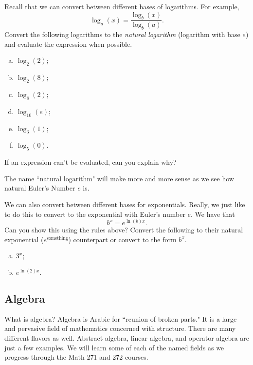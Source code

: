     \begin{problem*}
    Recall that we can convert between different bases of logarithms. For example,
    \[
    \log_a(x)=\frac{\log_b(x)}{\log_b(a)}.
    \]
    Convert the following logarithms to the \emph{natural logarithm} (logarithm with base $e$) and evaluate the expression when possible.
    \begin{enumerate}[(a)]
        \item $\log_2(2)$;
        \item $\log_2(8)$;
        \item $\log_8(2)$;
        \item $\log_{10}(e)$;
        \item $\log_3(1)$;
        \item $\log_5(0)$.
    \end{enumerate}
    If an expression can't be evaluated, can you explain why?
    \end{problem*}
    
    \begin{remark}
    The name ``natural logarithm" will make more and more sense as we see how natural Euler's Number $e$ is.
    \end{remark}
    
    \begin{problem*}
    We can also convert between different bases for exponentials. Really, we just like to do this to convert to the exponential with Euler's number $e$. We have that
    \[
    b^x=e^{\ln(b)x}.
    \]
    Can you show this using the rules above? Convert the following to their natural exponential ($e^\textrm{something}$) counterpart or convert to the form $b^x$.
    \begin{enumerate}[(a)]
        \item $3^x$;
        \item $e^{\ln(2)x}$.
    \end{enumerate}
    \end{problem*}
    
    \subsection{Algebra}
    
    What is algebra? Algebra is Arabic for ``reunion of broken parts." It is a large and pervasive field of mathematics concerned with structure.  There are many different flavors as well.  Abstract algebra, linear algebra, and operator algebra are just a few examples. We will learn some of each of the named fields as we progress through the Math 271 and 272 courses.
    

